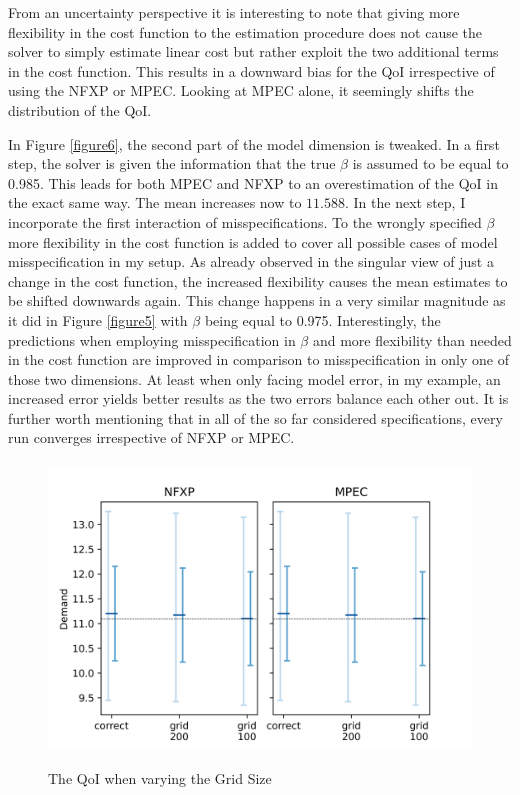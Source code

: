 From an uncertainty perspective it is interesting to note that giving more flexibility in the cost function to the estimation procedure does not cause the solver to simply estimate linear cost but rather exploit the two additional terms in the cost function. This results in a downward bias for the QoI irrespective of using the NFXP or MPEC. Looking at MPEC alone, it seemingly shifts the distribution of the QoI.

In Figure \ref{figure6}, the second part of the model dimension is tweaked. In a first step, the solver is given the information that the true $\beta$ is assumed to be equal to 0.985. This leads for both MPEC and NFXP to an overestimation of the QoI in the exact same way. The mean increases now to $11.588$. In the next step, I incorporate the first interaction of misspecifications. To the wrongly specified $\beta$ more flexibility in the cost function is added to cover all possible cases of model misspecification in my setup. As already observed in the singular view of just a change in the cost function, the increased flexibility causes the mean estimates to be shifted downwards again. This change happens in a very similar magnitude as it did in Figure \ref{figure5} with $\beta$ being equal to 0.975. Interestingly, the predictions when employing misspecification in $\beta$ and more flexibility than needed in the cost function are improved in comparison to misspecification in only one of those two dimensions. At least when only facing model error, in my example, an increased error yields better results as the two errors balance each other out. It is further worth mentioning that in all of the so far considered specifications, every run converges irrespective of NFXP or MPEC. \paragraph{}


\begin{figure}[!t]
	\caption{The QoI when varying the Grid Size}
	\vspace*{-4mm}
	\centering
	\includegraphics[scale=0.9]{../figures/figure_7.png}
	\label{figure7}
\end{figure}

